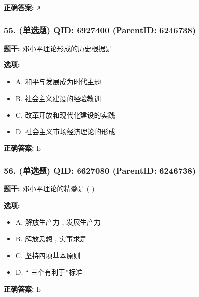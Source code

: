 \documentclass[12pt,UTF8]{ctexart}
\begin{document}
\textbf{正确答案:}
A

\vspace{0.3em}\hrulefill\vspace{0.7em}

\subsubsection*{55. (单选题) \small QID: 6927400 (ParentID: 6246738)}

\textbf{题干:}
邓小平理论形成的历史根据是



\textbf{选项:}
\begin{itemize}[leftmargin=*]

  \item A. 和平与发展成为时代主题

  \item B. 社会主义建设的经验教训

  \item C. 改革开放和现代化建设的实践

  \item D. 社会主义市场经济理论的形成

\end{itemize}

\textbf{正确答案:}
B

\vspace{0.3em}\hrulefill\vspace{0.7em}

\subsubsection*{56. (单选题) \small QID: 6627080 (ParentID: 6246738)}

\textbf{题干:}
邓小平理论的精髓是  ( )



\textbf{选项:}
\begin{itemize}[leftmargin=*]

  \item A. 解放生产力 , 发展生产力

  \item B. 解放思想 , 实事求是

  \item C. 坚持四项基本原则

  \item D. “ 三个有利于”标准

\end{itemize}

\textbf{正确答案:}
B
\end{document}
